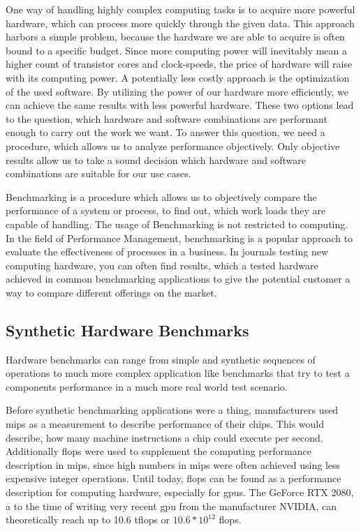 One way of handling highly complex computing tasks is to acquire more powerful
hardware, which can process more quickly through the given data. This approach
harbors a simple problem, because the hardware we are able to acquire is often
bound to a specific budget. Since more computing power will inevitably mean a
higher count of transistor cores and clock-speeds, the price of hardware will
raise with its computing power. A potentially less costly approach is the
optimization of the used software. By utilizing the power of our hardware more
efficiently, we can achieve the same results with less powerful hardware. These
two options lead to the question, which hardware and software combinations are
performant enough to carry out the work we want. To answer this question, we
need a procedure, which allows us to analyze performance objectively. Only
objective results allow us to take a sound decision which hardware and software
combinations are suitable for our use cases. \cite{mooresLaw}

Benchmarking is a procedure which allows us to objectively compare the
performance of a system or process, to find out, which work loads they are
capable of handling. The usage of Benchmarking is not restricted to computing.
In the field of Performance Management, benchmarking is a popular approach to
evaluate the effectiveness of processes in a business. In journals testing new
computing hardware, you can often find results, which a tested hardware achieved
in common benchmarking applications to give the potential customer a way to
compare different offerings on the market.
\cite{BenchmPerfManagement}



\subsection{Synthetic Hardware Benchmarks}

Hardware benchmarks can range from simple and synthetic sequences of operations
to much more complex application like benchmarks that try to test a components
performance in a much more real world test scenario.

Before synthetic benchmarking applications were a thing, manufacturers used
\gls{mips} as a measurement to describe performance of their chips. This would
describe, how many machine instructions a chip could execute per second.
Additionally \gls{flops} were used to supplement the computing performance
description in \gls{mips}, since high numbers in \gls{mips} were often achieved
using less expensive integer operations. Until today, \gls{flops} can be found
as a performance description for computing hardware, especially for \glspl{gpu}.
The GeForce RTX 2080, a to the time of writing very recent \gls{gpu} from the
manufacturer NVIDIA, can theoretically reach up to 10.6 \gls{tflops} or $10.6 *
10^{12}$ \gls{flops}.
\cite{heiseGtx2080}

